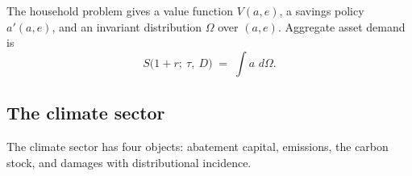 \documentclass[12pt]{article}
\newcommand{\Sfun}{S}
\newcommand{\dd}{\,d}
\begin{document}
The household problem gives a value function $V(a,e)$, a savings policy
$a'(a,e)$, and an invariant distribution $\Omega$ over $(a,e)$. Aggregate
asset demand is
\begin{equation}
\Sfun\big(1+r;\ \tau,\ D\big) \;=\; \int a \,\dd\Omega .
\label{eq:Sdef}
\end{equation}

\subsection{The climate sector}\label{subsec:climate}

The climate sector has four objects: abatement capital, emissions, the carbon
stock, and damages with distributional incidence.
\end{document}
